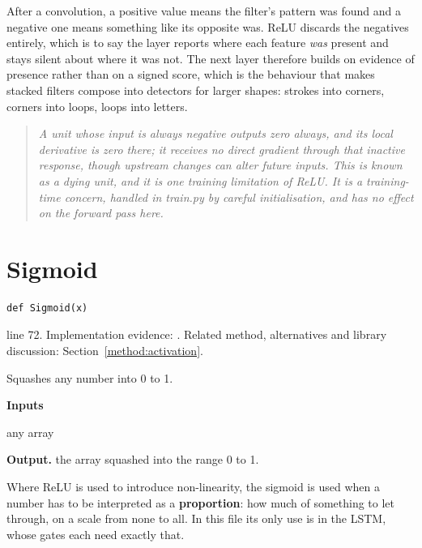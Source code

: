 After a convolution, a positive value means the filter's pattern was found and a negative one means something like its opposite was. ReLU discards the negatives entirely, which is to say the layer reports where each feature \emph{was} present and stays silent about where it was not. The next layer therefore builds on evidence of presence rather than on a signed score, which is the behaviour that makes stacked filters compose into detectors for larger shapes: strokes into corners, corners into loops, loops into letters.


\begin{quote}\small\itshape A unit whose input is always negative outputs zero always, and its local derivative is zero there; it receives no direct gradient through that inactive response, though upstream changes can alter future inputs. This is known as a dying unit, and it is one training limitation of ReLU. It is a training-time concern, handled in train.py by careful initialisation, and has no effect on the forward pass here.\end{quote}


\section{Sigmoid}\label{fn:recognise:Sigmoid}
\begin{lstlisting}[style=sig]
def Sigmoid(x)
\end{lstlisting}
 line 72. Implementation evidence: \cite{code2026}. Related method, alternatives and library discussion: Section~\ref{method:activation}.


Squashes any number into 0 to 1.




\noindent\textbf{Inputs}
\begin{description}[leftmargin=2.2em,style=nextline,font=\normalfont\ttfamily]\setlength\itemsep{1pt}
  \item[{x}] \normalfont any array
\end{description}

\noindent\textbf{Output.} the array squashed into the range 0 to 1.


Where ReLU is used to introduce non-linearity, the sigmoid is used when a number has to be interpreted as a \textbf{proportion}: how much of something to let through, on a scale from none to all. In this file its only use is in the LSTM, whose gates each need exactly that.


